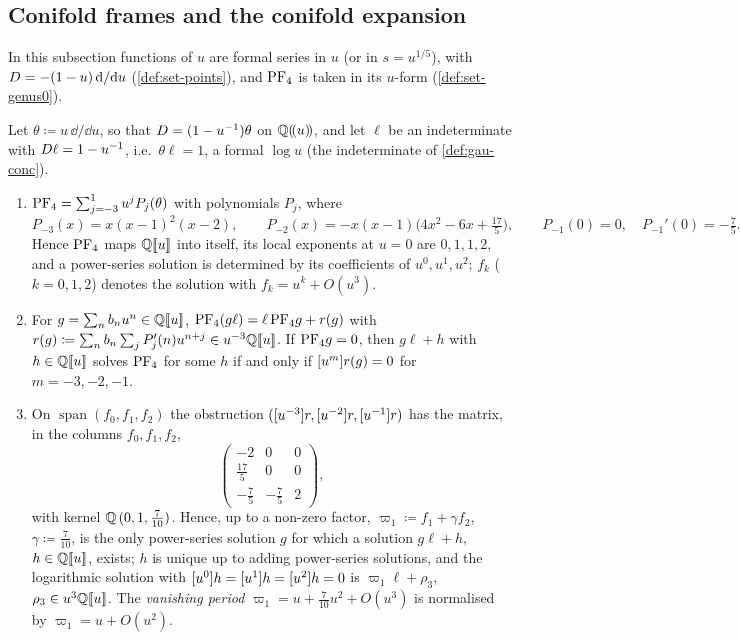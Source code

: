 
\subsection{Conifold frames and the conifold expansion}
\label{sec:set-frames}

In this subsection functions of $u$ are formal series in $u$ (or in $s=u^{1/5}$), with $D=-(1-u)\,\mathrm{d}/\mathrm{d} u$ (\cref{def:set-points}), and $\mathrm{PF}_{4}$ is taken in its $u$-form (\cref{def:set-genus0}).

\begin{lem}
\label{lem:set-frobbasis}
Let $\theta\coloneqq u\,\dd/\dd u$, so that $D=(1-u^{-1})\theta$ on $\mathbb{Q}(\!(u)\!)$, and let $\ell$ be an indeterminate with $D\ell=1-u^{-1}$, i.e.\ $\theta\ell=1$, a formal $\log u$ (the indeterminate of \cref{def:gau-conc}).
\begin{enumerate}
\item $\mathrm{PF}_{4}=\sum_{j=-3}^{1}u^jP_j(\theta)$ with polynomials $P_j$, where
\[
P_{-3}(x)=x(x-1)^2(x-2),\qquad P_{-2}(x)=-x(x-1)\bigl(4x^2-6x+\tfrac{17}5\bigr),\qquad P_{-1}(0)=0,\quad P_{-1}'(0)=-\tfrac75 .
\]
Hence $\mathrm{PF}_{4}$ maps $\mathbb{Q}[\![ u ]\!]$ into itself, its local exponents at $u=0$ are $0,1,1,2$, and a power-series solution is determined by its coefficients of $u^0,u^1,u^2$; $f_k$ ($k=0,1,2$) denotes the solution with $f_k=u^k+O(u^3)$.
\item For $g=\sum_nb_nu^n\in\mathbb{Q}[\![ u ]\!]$, $\mathrm{PF}_{4}(g\ell)=\ell\,\mathrm{PF}_{4} g+r(g)$ with $r(g)\coloneqq\sum_nb_n\sum_jP_j'(n)u^{n+j}\in u^{-3}\mathbb{Q}[\![ u ]\!]$. If $\mathrm{PF}_{4} g=0$, then $g\ell+h$ with $h\in\mathbb{Q}[\![ u ]\!]$ solves $\mathrm{PF}_{4}$ for some $h$ if and only if $[u^m]r(g)=0$ for $m=-3,-2,-1$.
\item On $\operatorname{span}(f_0,f_1,f_2)$ the obstruction $([u^{-3}]r,[u^{-2}]r,[u^{-1}]r)$ has the matrix, in the columns $f_0,f_1,f_2$,
\[
\begin{pmatrix}-2&0&0\\ \frac{17}5&0&0\\ -\frac75&-\frac75&2\end{pmatrix},
\]
with kernel $\mathbb{Q}\,(0,1,\frac7{10})$. Hence, up to a non-zero factor, $\varpi_1\coloneqq f_1+\gamma f_2$, $\gamma\coloneqq\frac7{10}$, is the only power-series solution $g$ for which a solution $g\ell+h$, $h\in\mathbb{Q}[\![ u ]\!]$, exists; $h$ is unique up to adding power-series solutions, and the logarithmic solution with $[u^0]h=[u^1]h=[u^2]h=0$ is $\varpi_1\ell+\rho_3$, $\rho_3\in u^3\mathbb{Q}[\![ u ]\!]$. The \emph{vanishing period} $\varpi_1=u+\frac7{10}u^2+O(u^3)$ is normalised by $\varpi_1=u+O(u^2)$.
\end{enumerate}
\end{lem}

